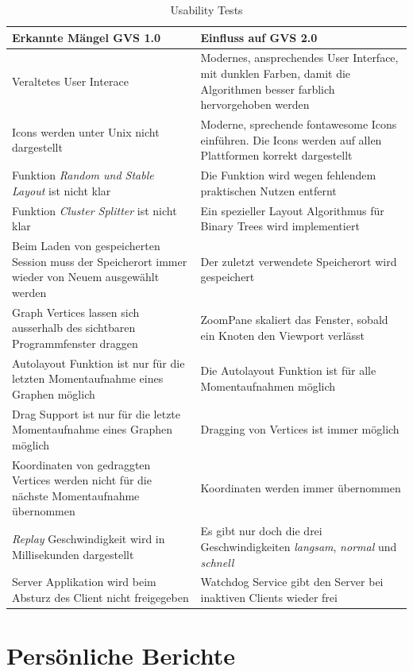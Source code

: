 \documentclass[11pt,a4paper,english,oneside]{book}
\numberwithin{equation}{chapter}
\begin{document}
	\begin{table}[h!]
		\centering
		\begin{tabularx}{\linewidth}{X X }
			\toprule 
			Erkannte Mängel GVS 1.0 & Einfluss auf GVS 2.0\\
			\midrule
			Veraltetes User Interace & Modernes, ansprechendes User Interface, mit dunklen Farben, damit die Algorithmen besser farblich hervorgehoben werden \\
			Icons werden unter Unix nicht dargestellt & Moderne, sprechende \gls{fontawesome} Icons einführen. Die Icons werden auf allen Plattformen korrekt dargestellt \\
			Funktion \textit{Random und Stable Layout} ist nicht klar & Die Funktion wird wegen fehlendem praktischen Nutzen entfernt \\
			Funktion \textit{Cluster Splitter} ist nicht klar & Ein spezieller Layout Algorithmus für Binary Trees wird implementiert \\
			Beim Laden von gespeicherten Session muss der Speicherort immer wieder von Neuem ausgewählt werden & Der zuletzt verwendete Speicherort wird gespeichert \\
			Graph Vertices lassen sich ausserhalb des sichtbaren Programmfenster draggen & ZoomPane skaliert das Fenster, sobald ein Knoten den Viewport verlässt \\
			Autolayout Funktion ist nur für die letzten Momentaufnahme eines Graphen möglich & Die Autolayout Funktion ist für alle Momentaufnahmen möglich \\
			Drag Support ist nur für die letzte Momentaufnahme eines Graphen möglich & Dragging von Vertices ist immer möglich \\
			Koordinaten von gedraggten Vertices werden nicht für die nächste Momentaufnahme übernommen & Koordinaten werden immer übernommen \\
			\textit{Replay} Geschwindigkeit wird in Millisekunden dargestellt & Es gibt nur doch die drei Geschwindigkeiten \textit{langsam}, \textit{normal} und \textit{schnell} \\
			Server Applikation wird beim Absturz des Client nicht freigegeben & Watchdog Service gibt den Server bei inaktiven Clients wieder frei \\
			\bottomrule 
		\end{tabularx} 
		\caption{Usability Tests} 
	\end{table}
	
	\chapter{Persönliche Berichte}
	\label{erfahrungsberichte}
\end{document}
